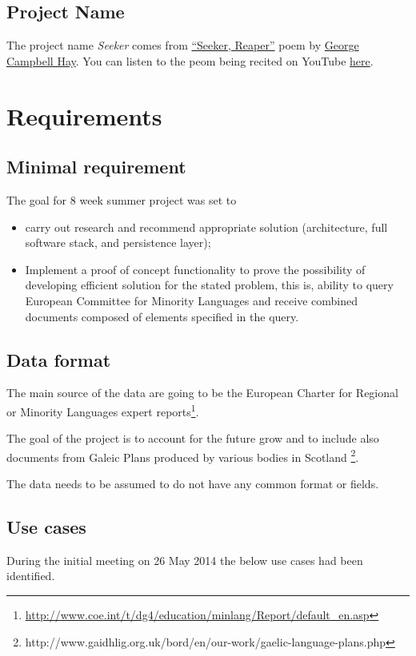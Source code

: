 \documentclass[11pt, a4paper]{report}
\begin{document}
\section{Project Name}
The project name \emph{Seeker} comes from \href{http://www.scottishpoetrylibrary.org.uk/poetry/poems/seeker-reaper}{``Seeker, Reaper''} poem by \href{http://en.wikipedia.org/wiki/George_Campbell_Hay}{George Campbell Hay}. You can listen to the peom being recited on YouTube \href{https://www.youtube.com/watch?v=gjxPtRZFF24}{here}.



\chapter{Requirements}

\section{Minimal requirement}
The goal for 8 week summer project was set to
\begin{itemize}
  \item carry out research and recommend appropriate solution (architecture, full software stack, and persistence layer);
  \item Implement a proof of concept functionality to prove the possibility of developing efficient solution for the stated problem, this is, ability to query European Committee for Minority Languages and receive combined documents composed of elements specified in the query.
\end{itemize}

\section{Data format}
The main source of the data are going to be the European Charter for Regional or Minority Languages expert reports\footnote{\url{http://www.coe.int/t/dg4/education/minlang/Report/default_en.asp}}.

The goal of the project is to account for the future grow and to include also documents from Galeic Plans produced by various bodies in Scotland \footnote{http://www.gaidhlig.org.uk/bord/en/our-work/gaelic-language-plans.php}.

The data needs to be assumed to do not have any common format or fields.

\section{Use cases}
During the initial meeting on 26 May 2014 the below use cases had been identified.
\end{document}
